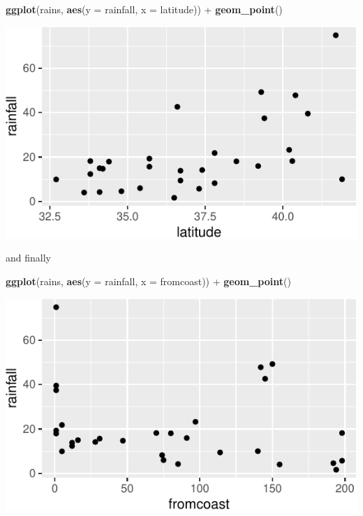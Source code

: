 \documentclass[]{tufte-book}
\newenvironment{Shaded}{}{}
\newcommand{\DataTypeTok}[1]{\textcolor[rgb]{0.56,0.13,0.00}{#1}}
\newcommand{\KeywordTok}[1]{\textcolor[rgb]{0.00,0.44,0.13}{\textbf{#1}}}
\newcommand{\NormalTok}[1]{#1}
\newcommand{\OperatorTok}[1]{\textcolor[rgb]{0.40,0.40,0.40}{#1}}
\newcommand{\StringTok}[1]{\textcolor[rgb]{0.25,0.44,0.63}{#1}}
\theoremstyle{definition}
\theoremstyle{definition}
\theoremstyle{definition}
\theoremstyle{remark}
\begin{document}
\begin{Shaded}
\begin{Highlighting}[]
\KeywordTok{ggplot}\NormalTok{(rains, }\KeywordTok{aes}\NormalTok{(}\DataTypeTok{y =}\NormalTok{ rainfall, }\DataTypeTok{x =}\NormalTok{ latitude)) }\OperatorTok{+}\StringTok{ }
\StringTok{    }\KeywordTok{geom_point}\NormalTok{()}
\end{Highlighting}
\end{Shaded}

\includegraphics{12-regression_files/figure-latex/unnamed-chunk-9-1}

and finally

\begin{Shaded}
\begin{Highlighting}[]
\KeywordTok{ggplot}\NormalTok{(rains, }\KeywordTok{aes}\NormalTok{(}\DataTypeTok{y =}\NormalTok{ rainfall, }\DataTypeTok{x =}\NormalTok{ fromcoast)) }\OperatorTok{+}\StringTok{ }
\StringTok{    }\KeywordTok{geom_point}\NormalTok{()}
\end{Highlighting}
\end{Shaded}

\includegraphics{12-regression_files/figure-latex/unnamed-chunk-10-1}
\end{document}
